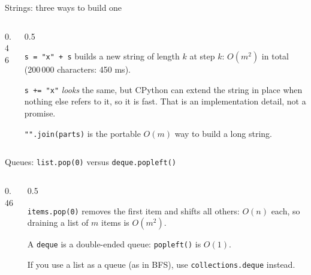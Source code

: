 \documentclass[aspectratio=169,10pt]{beamer}
\begin{document}
\begin{frame}{Strings: three ways to build one}
\begin{columns}[T]
\begin{column}{0.46\textwidth}
\end{column}
\begin{column}{0.5\textwidth}
\vspace{2mm}
{\small
\texttt{s = "x" + s} builds a new string of length $k$ at step $k$: $O(m^2)$ in total (200\,000 characters: 450 ms).

\vspace{1mm}
\texttt{s += "x"} \emph{looks} the same, but CPython can extend the string in place when nothing else refers to it, so it is fast. That is an implementation detail, not a promise.

\vspace{1mm}
\texttt{"".join(parts)} is the portable $O(m)$ way to build a long string.}
\end{column}
\end{columns}
\end{frame}

\begin{frame}{Queues: \texttt{list.pop(0)} versus \texttt{deque.popleft()}}
\begin{columns}[T]
\begin{column}{0.46\textwidth}
\end{column}
\begin{column}{0.5\textwidth}
\vspace{2mm}
{\small
\texttt{items.pop(0)} removes the first item and shifts all others: $O(n)$ each, so draining a list of $m$ items is $O(m^2)$.

\vspace{1mm}
A \texttt{deque} is a double-ended queue: \texttt{popleft()} is $O(1)$.

\vspace{1mm}
If you use a list as a queue (as in BFS), use \texttt{collections.deque} instead.}
\end{column}
\end{columns}
\end{frame}
\end{document}
